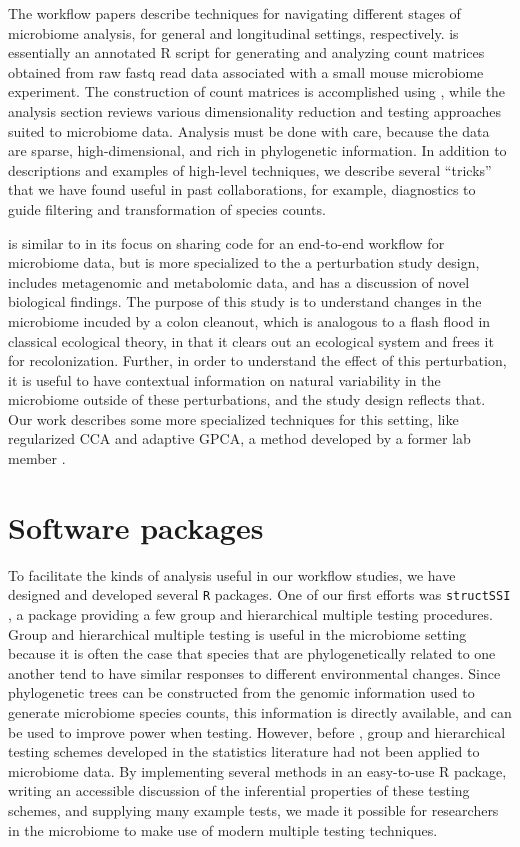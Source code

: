 \documentclass{article}
\begin{document}
The workflow papers \citep{Callahan2016, Fukuyama2017} describe techniques for
navigating different stages of microbiome analysis, for general and longitudinal
settings, respectively. \citep{Callahan2016} is essentially an annotated R
script for generating and analyzing count matrices obtained from raw fastq read
data associated with a small mouse microbiome experiment. The construction of
count matrices is accomplished using \citep{callahan2016dada2}, while the
analysis section reviews various dimensionality reduction and testing approaches
suited to microbiome data. Analysis must be done with care, because the data are
sparse, high-dimensional, and rich in phylogenetic information. In addition to
descriptions and examples of high-level techniques, we describe several
``tricks'' that we have found useful in past collaborations, for example,
diagnostics to guide filtering and transformation of species counts.

\citep{Fukuyama2017} is similar to \citep{Callahan2016} in its focus on sharing
code for an end-to-end workflow for microbiome data, but is more specialized to
the a perturbation study design, includes metagenomic and metabolomic data, and
has a discussion of novel biological findings. The purpose of this study is to
understand changes in the microbiome incuded by a colon cleanout, which is
analogous to a flash flood in classical ecological theory, in that it clears out
an ecological system and frees it for recolonization. Further, in order to
understand the effect of this perturbation, it is useful to have contextual
information on natural variability in the microbiome outside of these
perturbations, and the study design reflects that. Our work describes some more
specialized techniques for this setting, like regularized CCA and adaptive GPCA,
a method developed by a former lab member \citep{fukuyama2017adaptive}.

\section{Software packages}

To facilitate the kinds of analysis useful in our workflow studies, we have
designed and developed several \texttt{R} packages. One of our first efforts was
\texttt{structSSI} \citep{sankaran2014structssi}, a package providing a few
group and hierarchical multiple testing procedures. Group and hierarchical
multiple testing is useful in the microbiome setting because it is often the
case that species that are phylogenetically related to one another tend to have
similar responses to different environmental changes. Since phylogenetic trees
can be constructed from the genomic information used to generate microbiome
species counts, this information is directly available, and can be used to
improve power when testing. However, before \citep{sankaran2014structssi}, group
and hierarchical testing schemes developed in the statistics literature had not
been applied to microbiome data. By implementing several methods in an
easy-to-use R package, writing an accessible discussion of the inferential
properties of these testing schemes, and supplying many example tests, we made
it possible for researchers in the microbiome to make use of modern multiple
testing techniques.
\end{document}
